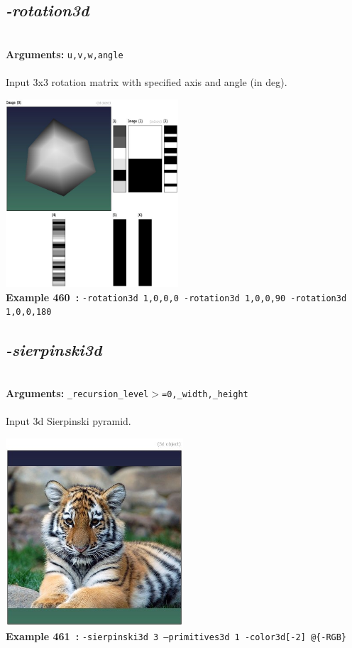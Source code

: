 \documentclass[a4paper,11pt,twoside]{book}
\begin{document}
\subsection{\emph{-rotation3d} }\vspace*{-0.5em}
~\\\textbf{Arguments: } 
{\small \texttt{u,v,w,angle}}\\~\\
Input 3x3 rotation matrix with specified axis and angle (in deg).
\begin{center}\includegraphics[keepaspectratio=true,height=7cm,width=\textwidth]{img/gmic_def460.jpg}\\
{\footnotesize \textbf{Example 460~:} \texttt{-rotation3d 1,0,0,0 -rotation3d 1,0,0,90 -rotation3d 1,0,0,180}}
\end{center}

\subsection{\emph{-sierpinski3d} }\vspace*{-0.5em}
~\\\textbf{Arguments: } 
{\small \texttt{\_recursion\_level$>$=0,\_width,\_height}}\\~\\
Input 3d Sierpinski pyramid.
\begin{center}\includegraphics[keepaspectratio=true,height=7cm,width=\textwidth]{img/gmic_def461.jpg}\\
{\footnotesize \textbf{Example 461~:} \texttt{-sierpinski3d 3 --primitives3d 1 -color3d[-2] @\{-RGB\}}}
\end{center}
\end{document}
